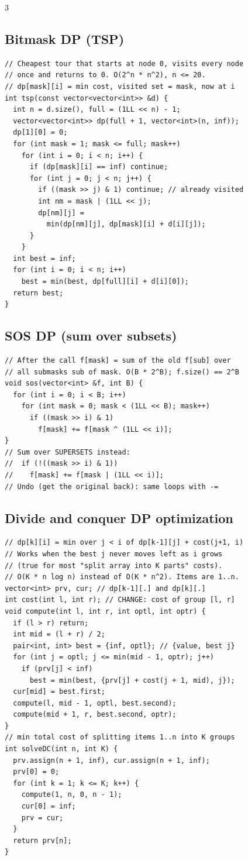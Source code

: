 \documentclass[8pt, a4paper]{article}
\begin{document}
\begin{multicols*}{3}
\subsection{Bitmask DP (TSP)}
\begin{lstlisting}
// Cheapest tour that starts at node 0, visits every node
// once and returns to 0. O(2^n * n^2), n <= 20.
// dp[mask][i] = min cost, visited set = mask, now at i
int tsp(const vector<vector<int>> &d) {
  int n = d.size(), full = (1LL << n) - 1;
  vector<vector<int>> dp(full + 1, vector<int>(n, inf));
  dp[1][0] = 0;
  for (int mask = 1; mask <= full; mask++)
    for (int i = 0; i < n; i++) {
      if (dp[mask][i] == inf) continue;
      for (int j = 0; j < n; j++) {
        if ((mask >> j) & 1) continue; // already visited
        int nm = mask | (1LL << j);
        dp[nm][j] =
          min(dp[nm][j], dp[mask][i] + d[i][j]);
      }
    }
  int best = inf;
  for (int i = 0; i < n; i++)
    best = min(best, dp[full][i] + d[i][0]);
  return best;
}
\end{lstlisting}
\subsection{SOS DP (sum over subsets)}
\begin{lstlisting}
// After the call f[mask] = sum of the old f[sub] over
// all submasks sub of mask. O(B * 2^B); f.size() == 2^B
void sos(vector<int> &f, int B) {
  for (int i = 0; i < B; i++)
    for (int mask = 0; mask < (1LL << B); mask++)
      if ((mask >> i) & 1)
        f[mask] += f[mask ^ (1LL << i)];
}
// Sum over SUPERSETS instead:
//  if (!((mask >> i) & 1))
//    f[mask] += f[mask | (1LL << i)];
// Undo (get the original back): same loops with -=
\end{lstlisting}
\subsection{Divide and conquer DP optimization}
\begin{lstlisting}
// dp[k][i] = min over j < i of dp[k-1][j] + cost(j+1, i)
// Works when the best j never moves left as i grows
// (true for most "split array into K parts" costs).
// O(K * n log n) instead of O(K * n^2). Items are 1..n.
vector<int> prv, cur; // dp[k-1][.] and dp[k][.]
int cost(int l, int r); // CHANGE: cost of group [l, r]
void compute(int l, int r, int optl, int optr) {
  if (l > r) return;
  int mid = (l + r) / 2;
  pair<int, int> best = {inf, optl}; // {value, best j}
  for (int j = optl; j <= min(mid - 1, optr); j++)
    if (prv[j] < inf)
      best = min(best, {prv[j] + cost(j + 1, mid), j});
  cur[mid] = best.first;
  compute(l, mid - 1, optl, best.second);
  compute(mid + 1, r, best.second, optr);
}
// min total cost of splitting items 1..n into K groups
int solveDC(int n, int K) {
  prv.assign(n + 1, inf), cur.assign(n + 1, inf);
  prv[0] = 0;
  for (int k = 1; k <= K; k++) {
    compute(1, n, 0, n - 1);
    cur[0] = inf;
    prv = cur;
  }
  return prv[n];
}
\end{lstlisting}

\end{multicols*}
\end{document}
